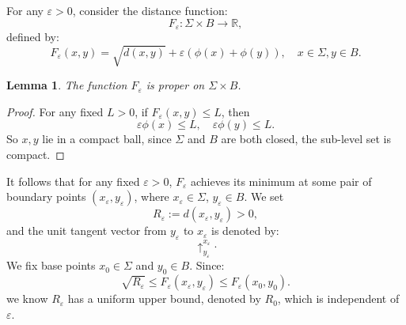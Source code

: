 \documentclass[reqno, 11pt]{amsart}
\theoremstyle{plain}
\newtheorem{lemma}[lemma]{Lemma}
\theoremstyle{definition}
\theoremstyle{remark}
\numberwithin{equation}{section}
\begin{document}
For any $\varepsilon>0$, consider the distance function:
\begin{equation}\label{eq:TheFun}
	F_{\varepsilon}: \Sigma\times B\to \mathbb{R},
\end{equation}
defined by:
\begin{equation*}
	F_{\varepsilon}(x, y) = \sqrt{d(x, y)} + \varepsilon (\phi(x)+\phi(y)),\quad x\in \Sigma, y\in B.
\end{equation*}

\begin{lemma}\label{lem:properness}
	The function $F_{\varepsilon}$ is proper on $\Sigma\times B$.
\end{lemma}
\begin{proof}
	For any fixed $L>0$, if $F_{\varepsilon}(x,y)\le L$, then
	\begin{equation*}
		\varepsilon \phi(x) \le L, \quad  \varepsilon \phi(y)\le L.
	\end{equation*}
	So $x, y$ lie in a compact ball, since $\Sigma$ and $B$ are both closed, the sub-level set is compact.
\end{proof}

It follows that for any fixed $\varepsilon>0$, $F_{\varepsilon}$ achieves its minimum at some pair of boundary points $(x_{\varepsilon}, y_{\varepsilon})$, where $x_{\varepsilon}\in \Sigma$, $y_{\varepsilon}\in B$. We set
\begin{equation}\label{eq:def}
	R_{\varepsilon}:= d(x_{\varepsilon}, y_{\varepsilon})>0,
\end{equation}
and the unit tangent vector from $y_{\varepsilon}$ to $x_{\varepsilon}$ is denoted by:
\begin{equation*}
	\uparrow^{x_{\varepsilon}}_{y_{\varepsilon}}.
\end{equation*}
We fix base points $x_{0}\in \Sigma$ and $y_{0}\in B$. Since:
\begin{equation}\label{eq:F_UpperBound}
	\sqrt{R_{\varepsilon}} \le F_{\varepsilon}(x_{\varepsilon}, y_{\varepsilon}) \le F_{\varepsilon}(x_{0}, y_{0}).
\end{equation}
we know $R_{\varepsilon}$ has a uniform upper bound, denoted by $R_{0}$, which is independent of $\varepsilon$.
\end{document}
